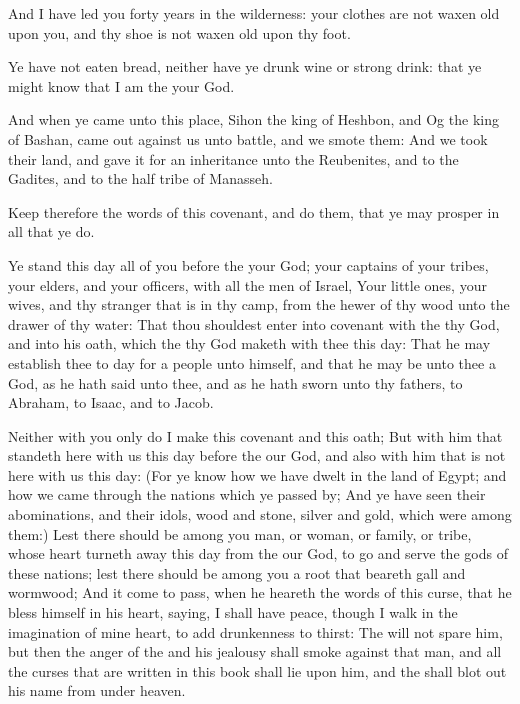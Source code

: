 \verse And I have led you forty years in the wilderness: your clothes are not waxen old upon you, and thy shoe is not waxen old upon thy foot.

\verse Ye have not eaten bread, neither have ye drunk wine or strong drink: that ye might know that I am the \LORD your God.

\verse And when ye came unto this place, Sihon the king of Heshbon, and Og the king of Bashan, came out against us unto battle, and we smote them: \verse And we took their land, and gave it for an inheritance unto the Reubenites, and to the Gadites, and to the half tribe of Manasseh.

\verse Keep therefore the words of this covenant, and do them, that ye may prosper in all that ye do.

\verse Ye stand this day all of you before the \LORD your God; your captains of your tribes, your elders, and your officers, with all the men of Israel, \verse Your little ones, your wives, and thy stranger that is in thy camp, from the hewer of thy wood unto the drawer of thy water: \verse That thou shouldest enter into covenant with the \LORD thy God, and into his oath, which the \LORD thy God maketh with thee this day: \verse That he may establish thee to day for a people unto himself, and that he may be unto thee a God, as he hath said unto thee, and as he hath sworn unto thy fathers, to Abraham, to Isaac, and to Jacob.

\verse Neither with you only do I make this covenant and this oath; \verse But with him that standeth here with us this day before the \LORD our God, and also with him that is not here with us this day: \verse (For ye know how we have dwelt in the land of Egypt; and how we came through the nations which ye passed by; \verse And ye have seen their abominations, and their idols, wood and stone, silver and gold, which were among them:) \verse Lest there should be among you man, or woman, or family, or tribe, whose heart turneth away this day from the \LORD our God, to go and serve the gods of these nations; lest there should be among you a root that beareth gall and wormwood; \verse And it come to pass, when he heareth the words of this curse, that he bless himself in his heart, saying, I shall have peace, though I walk in the imagination of mine heart, to add drunkenness to thirst: \verse The \LORD will not spare him, but then the anger of the \LORD and his jealousy shall smoke against that man, and all the curses that are written in this book shall lie upon him, and the \LORD shall blot out his name from under heaven.

